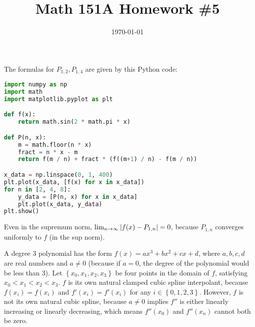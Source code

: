\documentclass{article}
\date{\today}
\title{Math 151A Homework \#5}
\begin{document}
\maketitle


\bigskip
\begin{prob}
\end{prob}
The formulas for $P_{1,2}, P_{1,4}$ are given by this Python code:

\begin{lstlisting}[language=Python]
import numpy as np
import math
import matplotlib.pyplot as plt

def f(x):
    return math.sin(2 * math.pi * x)

def P(n, x):
    m = math.floor(n * x)
    fract = n * x - m
    return f(m / n) + fract * (f((m+1) / n) - f(m / n))

x_data = np.linspace(0, 1, 400)
plt.plot(x_data, [f(x) for x in x_data])
for n in [2, 4, 8]:
    y_data = [P(n, x) for x in x_data]
    plt.plot(x_data, y_data)
plt.show()
\end{lstlisting}
Even in the supremum norm, $\lim_{n \rightarrow \infty} \left\lvert f(x) - P_{1,n} \right\rvert = 0$, because $P_{1, n}$ converges uniformly to $f$ (in the sup norm).

\bigskip
\begin{prob}
\end{prob}
A degree 3 polynomial has the form $f(x) = a x^3 + b x^2 + c x + d$, where $a,b,c,d$ are real numbers and $a \neq 0$ (because if $a=0$, the degree of the polynomial would be less than 3). Let $ \left\{ x_0, x_1, x_2, x_3 \right\}$ be four points in the domain of $f$, satisfying $x_0 < x_1 < x_2 < x_3$. $f$ is its own natural clamped cubic spline interpolant, because $f(x_i) = f(x_i)$ and $f'(x_i)=f'(x_i)$ for any $i \in \left\{ 0,1,2,3 \right\}$. However, $f$ is not its own natural cubic spline, because $a \neq 0$ implies $f''$ is either linearly increasing or linearly decreasing, which means $f''(x_0)$ and $f''(x_n)$ cannot both be zero.
\end{document}
